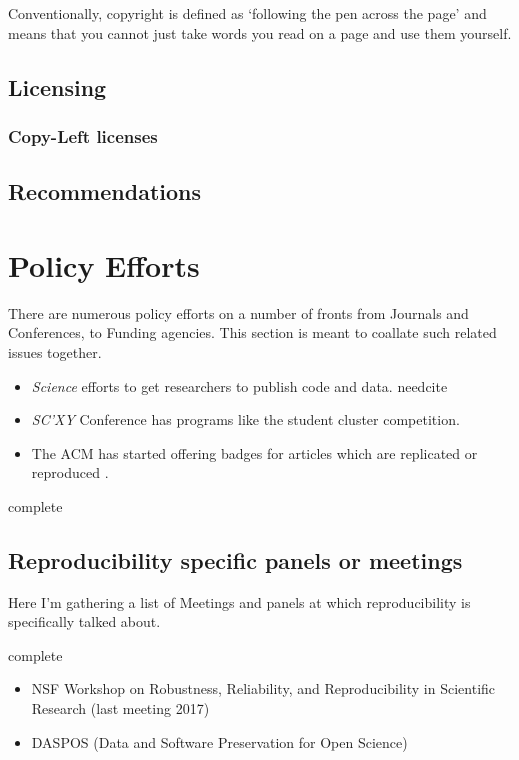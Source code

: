 \documentclass[american]{article}
\newcommand{\complete}{
	\gls{complete}
}
\newcommand{\needcite}{
	\gls{needcite}
}
\begin{document}
Conventionally, copyright is defined as `following the pen across the page' and means that you cannot just take words you read on a page and use them yourself.

\subsection{Licensing} \label{sec:legal-licensing}

\subsubsection{Copy-Left licenses} \label{sec:legal-licensing-left}

\subsection{Recommendations} \label{sec:legal-recommendations}

\section{Policy Efforts} \label{sec:policy}

There are numerous policy efforts on a number of fronts from Journals and Conferences, to Funding agencies. This section is meant to coallate such related issues together.

\begin{itemize}
\item \textit{Science} efforts to get researchers to publish code and data. \needcite
\item \textit{SC'XY} Conference has programs like the student cluster competition. \cite{sighpc-connect-repro-1,sighpc-connect-repro-2}
\item The ACM has started offering badges for articles which are replicated or reproduced \cite{acm-badging-announcement}.
\end{itemize}

\complete

\subsection{Reproducibility specific panels or meetings} \label{sec:policy-panels}

Here I'm gathering a list of Meetings and panels at which reproducibility is specifically talked about.

\complete

\begin{itemize}
\item NSF Workshop on Robustness, Reliability, and Reproducibility in Scientific Research (last meeting 2017)
\item DASPOS (Data and Software Preservation for Open Science) \cite{hildreth-daspos-2014}
\end{itemize}
\end{document}
